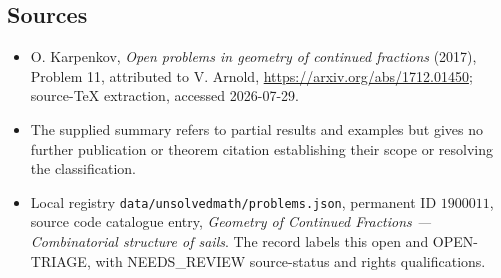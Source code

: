 \documentclass[11pt]{article}
\begin{document}
\subsection{Sources}
\begin{itemize}
\item O. Karpenkov, \emph{Open problems in geometry of continued fractions} (2017), Problem 11, attributed to V. Arnold, \url{https://arxiv.org/abs/1712.01450}; source-TeX extraction, accessed 2026-07-29.
\item The supplied summary refers to partial results and examples but gives no further publication or theorem citation establishing their scope or resolving the classification.
\item Local registry \texttt{data/unsolvedmath/problems.json}, permanent ID $1900011$, source code catalogue entry, \emph{Geometry of Continued Fractions --- Combinatorial structure of sails}. The record labels this open and OPEN-TRIAGE, with NEEDS\_REVIEW source-status and rights qualifications.
\end{itemize}
\end{document}
